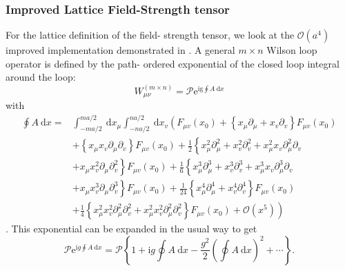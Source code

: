 \documentclass[a4paper,10pt]{article}
\begin{document}
\subsubsection{Improved Lattice Field-Strength tensor}
For the lattice definition of the field- strength tensor, we look at the $\mathcal{O}\left(a^{4}\right)$ improved implementation demonstrated in \cite{BILSONTHOMPSON20031}. A general $m\times n$ Wilson loop operator is defined by the path- ordered exponential of the closed loop integral around the loop:
\begin{equation}
W_{\mu \nu}^{(m \times n)}=\mathscr{P} \mathrm{e}^{\mathrm{ig} \oint A \mathrm{~d} x}
\end{equation}
with 
\begin{equation}\label{eq:WilsonLoopExpansionLoopIntegral}
\begin{aligned}
\oint A \mathrm{~d} x=& \int_{-m a / 2}^{m a / 2} \mathrm{~d} x_{\mu} \int_{-n a / 2}^{n a / 2} \mathrm{~d} x_{v}\left(F_{\mu v}\left(x_{0}\right)+\left\{x_{\mu} \partial_{\mu}+x_{v} \partial_{v}\right\} F_{\mu v}\left(x_{0}\right)\right.\\
&+\left\{x_{\mu} x_{v} \partial_{\mu} \partial_{v}\right\} F_{\mu v}\left(x_{0}\right)+\frac{1}{2}\left\{x_{\mu}^{2} \partial_{\mu}^{2}+x_{v}^{2} \partial_{v}^{2}+x_{\mu}^{2} x_{v} \partial_{\mu}^{2} \partial_{v}\right.\\
&\left.+x_{\mu} x_{v}^{2} \partial_{\mu} \partial_{v}^{2}\right\} F_{\mu v}\left(x_{0}\right)+\frac{1}{6}\left\{x_{\mu}^{3} \partial_{\mu}^{3}+x_{v}^{3} \partial_{v}^{3}+x_{\mu}^{3} x_{v} \partial_{\mu}^{3} \partial_{v}\right.\\
&\left.+x_{\mu} x_{v}^{3} \partial_{\mu} \partial_{v}^{3}\right\} F_{\mu v}\left(x_{0}\right)+\frac{1}{24}\left\{x_{\mu}^{4} \partial_{\mu}^{4}+x_{v}^{4} \partial_{v}^{4}\right\} F_{\mu v}\left(x_{0}\right) \\
&\left.+\frac{1}{4}\left\{x_{\mu}^{2} x_{v}^{2} \partial_{\mu}^{2} \partial_{v}^{2}+x_{\mu}^{2} x_{v}^{2} \partial_{\mu}^{2} \partial_{v}^{2}\right\} F_{\mu v}\left(x_{0}\right)+\mathcal{O}\left(x^{5}\right)\right) 
\end{aligned}
\end{equation}
\cite{BILSONTHOMPSON20031}. This exponential can be expanded in the usual way to get 
\begin{equation}
\mathscr{P} \mathrm{e}^{\mathrm{i} g \oint A \mathrm{~d} x}=\mathscr{P}\left\{1+\mathrm{i} g \oint A \mathrm{~d} x-\frac{g^{2}}{2}(\oint A \mathrm{~d} x)^{2}+\cdots\right\}.
\end{equation}
\end{document}
